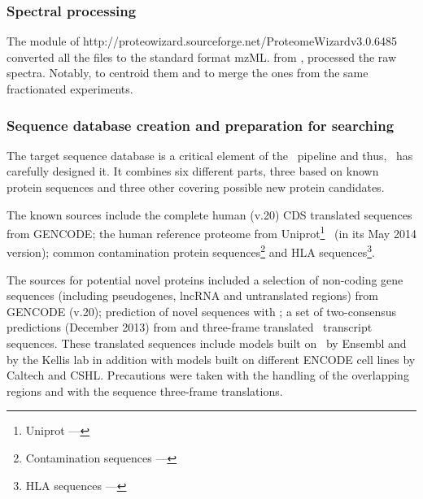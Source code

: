 \subsubsection{Spectral processing}\label{subsub:spectralProcessing}

The  module of %
{http://proteowizard.sourceforge.net/}{ProteomeWizard}{v3.0.6485}
converted all the files to the standard format mzML.\@
{} from
,
processed the raw spectra. Notably,  to centroid them
and  to merge the ones from the same fractionated experiments.

\subsubsection{Sequence database creation and preparation for searching}%
\label{subsub:seqDBseeking}

The target sequence database is a critical element of the \ms\ pipeline and thus,
\james\ has carefully designed it.
It combines six different parts, three based on
known protein sequences and three other covering possible new protein candidates.

The known sources include the complete human  (v.20) \gls{CDS} translated
sequences from \gls{GENCODE}; the human reference proteome from
\gls{Uniprot}\footnote{%
\gls{Uniprot} --- }~
(in its May 2014 version); common contamination protein
sequences\footnote{Contamination sequences ---
}
and \gls{HLA} sequences\footnote{\gls{HLA} sequences ---
}.

The sources for potential
novel proteins included a selection of non-coding gene sequences (including
pseudogenes, \gls{lncRNA} and untranslated regions) from \gls{GENCODE}
 (v.20); prediction of novel sequences with
;
a set of two-consensus predictions (December 2013)
from 
and three-frame translated \Rnaseq\ transcript sequences.
These translated sequences include models
built on \ibm\ by \gls{Ensembl} and by the Kellis lab in addition with
models built on different \gls{ENCODE} cell lines by Caltech and CSHL\@.
Precautions were taken with the handling of the overlapping regions
and with the sequence three-frame translations.

